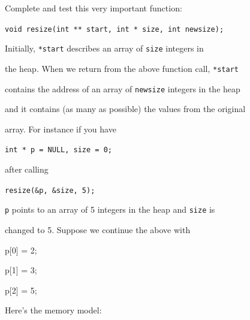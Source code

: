 Complete and test this very important function:



\verb!void resize(int ** start, int * size, int newsize);!



Initially, \texttt{*start} describes an array of \texttt{size} integers in

the heap. When we return from the above function call, \texttt{*start}

contains the address of an array of \texttt{newsize} integers in the heap

and it contains (as many as possible) the values from the original

array. For instance if you have



\verb!int * p = NULL, size = 0;!



after calling



\verb!resize(&p, &size, 5);!



\texttt{p} points to an array of 5 integers in the heap and \texttt{size} is

changed to 5. Suppose we continue the above with



\begin{consolethree}[escapeinside=||]

p[0] = 2;

p[1] = 3;

p[2] = 5;

\end{consolethree}



Here's the memory model:

